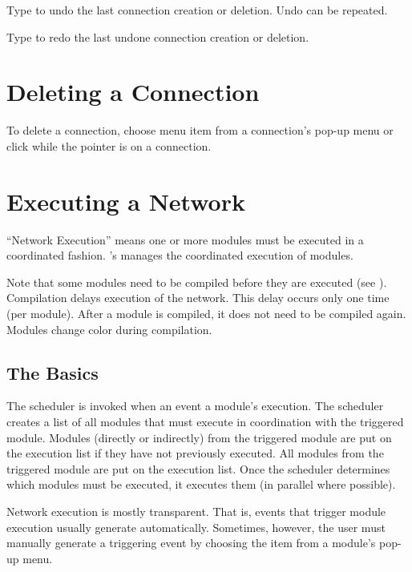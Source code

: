 Type  to undo the last connection creation or deletion.
Undo can be repeated.

Type  to redo the last undone connection creation or
deletion.
 
\section{Deleting a Connection}
\label{sec:deleteconnections}

To delete a connection, choose menu item  from a
connection's pop-up menu or click  while the
pointer is on a connection.

\section{Executing a Network}
\label{sec:executenet}

``Network Execution'' means one or more modules must be executed in a
coordinated fashion. 
\sr{}'s  manages the coordinated execution of modules.

Note that some modules need to be compiled before they are
executed (see ).  Compilation
delays execution of the network.  This delay occurs only one time
(per module).  After a module is compiled, it does not need to be
compiled again.  Modules change color during compilation.

\subsection{The Basics}

The scheduler is invoked when an event  a
module's execution.  The scheduler creates a list of all modules that
must execute in coordination with the triggered module. Modules
 (directly or indirectly) from the triggered module are 
put on the execution list if they have not previously executed.
All modules  from the triggered module are put
on the execution list.  Once the scheduler determines which modules must be
executed, it executes them (in parallel where possible).

Network execution is mostly transparent.  That is, events that trigger
module execution usually generate automatically. Sometimes,
however, the user must manually
generate a triggering event by choosing the  item from a
module's pop-up menu.

